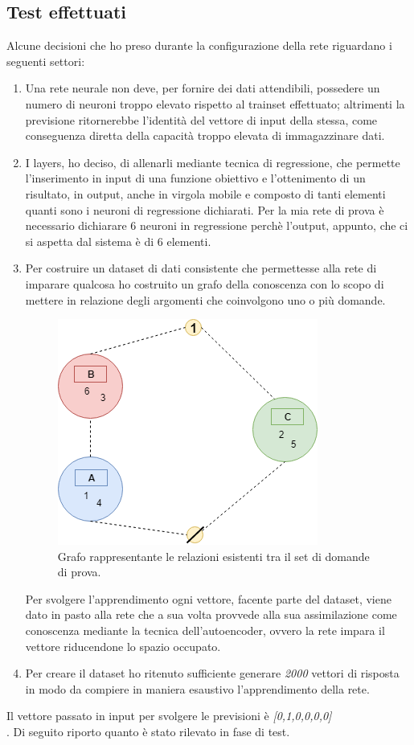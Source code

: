 \subsection{Test effettuati}
\label{Test effettuati}

Alcune decisioni che ho preso durante la configurazione della rete riguardano i seguenti settori:
\begin{enumerate}
\item Una rete neurale non deve, per fornire dei dati attendibili, possedere un numero di neuroni troppo elevato rispetto al trainset effettuato; altrimenti la previsione  ritornerebbe l'identit\`a del vettore di input della stessa, come conseguenza diretta della capacit\`a troppo elevata di immagazzinare dati.
\item I layers, ho deciso, di allenarli mediante tecnica di regressione, che permette l'inserimento in input di una funzione obiettivo e l'ottenimento di un risultato, in output, anche in virgola mobile e composto di tanti elementi quanti sono i neuroni di regressione dichiarati. Per la mia rete di prova \`e necessario dichiarare  6 neuroni in regressione perch\`e l'output, appunto, che ci si aspetta dal sistema \`e di 6 elementi.
\item Per costruire un dataset di dati consistente che permettesse alla rete di imparare qualcosa ho costruito un grafo della conoscenza con lo scopo di mettere in relazione degli argomenti che coinvolgono uno o pi\`u domande.
\begin{figure}[H]
\centering
	\includegraphics[width=0.60\linewidth]{./image/grafo_trainset.png}
	\caption{Grafo rappresentante le relazioni esistenti tra il set di domande di prova.}
\end{figure}
\noindent
Per svolgere l'apprendimento ogni vettore, facente parte del dataset, viene dato in pasto alla rete che a sua volta provvede alla sua assimilazione come conoscenza mediante la tecnica dell'autoencoder, ovvero la rete impara il vettore riducendone lo spazio occupato.
\item Per creare il dataset ho ritenuto sufficiente generare \textit{2000} vettori di risposta in modo da compiere in maniera esaustivo l'apprendimento della rete.
\end{enumerate}
\noindent
Il vettore passato in input per svolgere le previsioni \`e \textit{[0,1,0,0,0,0]}\\
\noindent. 
Di seguito riporto quanto \`e stato rilevato in fase di test.

